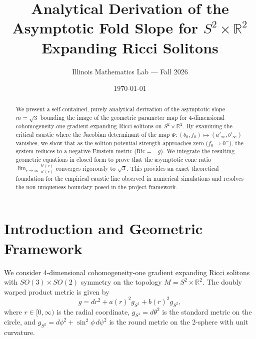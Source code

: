 \documentclass[12pt]{article}
\title{\textbf{Analytical Derivation of the Asymptotic Fold Slope for $S^2 \times \mathbb{R}^2$ Expanding Ricci Solitons}}
\author{Illinois Mathematics Lab --- Fall 2026}
\date{\today}
\begin{document}
\maketitle

\begin{abstract}
We present a self-contained, purely analytical derivation of the asymptotic slope $m = \sqrt{3}$ bounding the image of the geometric parameter map for 4-dimensional cohomogeneity-one gradient expanding Ricci solitons on $S^2 \times \mathbb{R}^2$. By examining the critical caustic where the Jacobian determinant of the map $\Phi: (b_0, f_0) \mapsto (a'_\infty, b'_\infty)$ vanishes, we show that as the soliton potential strength approaches zero ($f_0 \to 0^-$), the system reduces to a negative Einstein metric ($\text{Ric} = -g$). We integrate the resulting geometric equations in closed form to prove that the asymptotic cone ratio $\lim_{r \to \infty} \frac{b'(r)}{a'(r)}$ converges rigorously to $\sqrt{3}$. This provides an exact theoretical foundation for the empirical caustic line observed in numerical simulations and resolves the non-uniqueness boundary posed in the project framework.
\end{abstract}

\section{Introduction and Geometric Framework}

We consider 4-dimensional cohomogeneity-one gradient expanding Ricci solitons with $SO(3) \times SO(2)$ symmetry on the topology $M = S^2 \times \mathbb{R}^2$. The doubly warped product metric is given by
\begin{equation}
g = dr^2 + a(r)^2 g_{S^1} + b(r)^2 g_{S^2},
\end{equation}
where $r \in [0, \infty)$ is the radial coordinate, $g_{S^1} = d\theta^2$ is the standard metric on the circle, and $g_{S^2} = d\phi^2 + \sin^2\phi \, d\psi^2$ is the round metric on the 2-sphere with unit curvature. 
\end{document}
